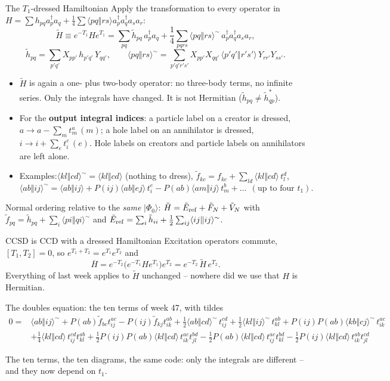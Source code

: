 \documentclass[aspectratio=169,10pt]{beamer}
\newcommand{\ket}[1]{\vert #1\rangle}
\newcommand{\cre}[1]{a_{#1}^{\dagger}}
\newcommand{\ann}[1]{a_{#1}}
\newcommand{\ph}{\Phi_0}
\newcommand{\Hbar}{\overline{H}}
\newcommand{\as}[4]{\langle #1#2\Vert #3#4\rangle}
\newcommand{\ft}{\tilde f}
\newcommand{\vt}[4]{\langle #1#2\Vert #3#4\rangle^{\sim}}
\begin{document}
\begin{frame}[shrink=13]{The $T_1$-dressed Hamiltonian}
\small
Apply the transformation to every operator in $H=\sum h_{pq}\cre p\ann q+\tfrac14\sum\as pqrs\cre p\cre q\ann s\ann r$:
\[
 \tilde H\equiv e^{-T_1}He^{T_1}=\sum_{pq}\tilde h_{pq}\,\cre p\ann q+\frac14\sum_{pqrs}\vt pqrs\,\cre p\cre q\ann s\ann r,
\]
\[
 \boxed{\tilde h_{pq}=\sum_{p'q'}X_{pp'}\,h_{p'q'}\,Y_{qq'},\qquad
 \vt pqrs=\sum_{p'q'r's'}X_{pp'}X_{qq'}\,\as{p'}{q'}{r'}{s'}\,Y_{rr'}Y_{ss'} .}
\]
\begin{itemize}
\item $\tilde H$ is again a one- plus two-body operator: no three-body terms, no infinite series. Only the integrals have changed. It is not Hermitian ($\tilde h_{pq}\ne\tilde h_{qp}^*$).
\item For the \textbf{output integral indices}: a particle label on a creator is dressed, $a\to a-\sum_mt_m^a\,(m)$; a hole label on an annihilator is dressed, $i\to i+\sum_et_i^e\,(e)$. Hole labels on creators and particle labels on annihilators are left alone.
\item Examples:\quad $\vt klcd=\as klcd$ (nothing to dress),\qquad
$\tilde f_{kc}=f_{kc}+\sum_{ld}\as klcd\,t_l^d$,
\[
 \vt abij=\as abij+P(ij)\as abej\,t_i^e-P(ab)\as amij\,t_m^b+\dots\ \ (\text{up to four }t_1).
\]
\end{itemize}
Normal ordering relative to the \emph{same} $\ket{\ph}$: $\tilde H=\tilde E_{\rm ref}+\tilde F_N+\tilde V_N$ with $\tilde f_{pq}=\tilde h_{pq}+\sum_i\vt piqi$ and $\tilde E_{\rm ref}=\sum_i\tilde h_{ii}+\tfrac12\sum_{ij}\vt ijij$.
\end{frame}

\begin{frame}{CCSD is CCD with a dressed Hamiltonian}
\small
Excitation operators commute, $[T_1,T_2]=0$, so $e^{T_1+T_2}=e^{T_1}e^{T_2}$ and
\[
 \boxed{\Hbar=e^{-T_2}\bigl(e^{-T_1}He^{T_1}\bigr)e^{T_2}=e^{-T_2}\,\tilde H\,e^{T_2}.}
\]
Everything of last week applies to $\tilde H$ unchanged -- nowhere did we use that $H$ is Hermitian.
\begin{block}{The doubles equation: the ten terms of week 47, with tildes}
\begin{align*}
0={}&\vt abij+P(ab)\ft_{bc}t_{ij}^{ac}-P(ij)\ft_{kj}t_{ik}^{ab}
 +\tfrac12\vt abcd\,t_{ij}^{cd}+\tfrac12\vt klij\,t_{kl}^{ab}+P(ij)P(ab)\vt kbcj\,t_{ik}^{ac}\\
 &+\tfrac14\as klcd\,t_{ij}^{cd}t_{kl}^{ab}
 +\tfrac12P(ij)P(ab)\as klcd\,t_{ik}^{ac}t_{jl}^{bd}
 -\tfrac12P(ab)\as klcd\,t_{ij}^{ac}t_{kl}^{bd}
 -\tfrac12P(ij)\as klcd\,t_{ik}^{ab}t_{jl}^{cd}
\end{align*}
\end{block}
The ten terms, the ten diagrams, the same code: only the integrals are different -- and they now depend on $t_1$.
\end{frame}
\end{document}
